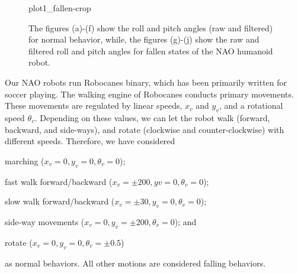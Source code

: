 \documentclass[letterpaper]{article}
\begin{document}
\begin{figure}[!ht]
{       {plot1_fallen-crop}}
  \caption{The figures (a)-(f) show the roll and pitch angles (raw and filtered) for normal 
behavior, while, the figures (g)-(j) show the raw and filtered roll and pitch angles for fallen 
states of the NAO humanoid robot.}
  \label{fig:normalFallenBehavior}

\end{figure}

Our NAO robots run {\sf Robocanes} binary, which has been primarily written for soccer
playing. The walking engine of {\sf Robocanes} conducts primary movements. These movements are
regulated by linear speeds, $x_v$ and $y_v$, and a rotational speed $\theta_v$. Depending on these
values, we can let the robot walk (forward, backward, and side-ways), and rotate (clockwise and
counter-clockwise) with different speeds. Therefore, we have considered \begin{inparaenum}[(1)]
\item marching ($x_v = 0 , y_v = 0, \theta_v = 0$); \item fast walk forward/backward ($x_v = \pm200
, y v = 0, \theta_v = 0$); \item \item slow walk forward/backward ($x_v = \pm30 , y_v = 0, \theta_v
= 0$); \item side-way movements ($x_v = 0, y_v = \pm200, \theta_v = 0$); and  \item rotate
($x_v = 0 , y_v = 0, \theta_v = \pm 0.5$) \end{inparaenum} as normal behaviors. All other motions
are considered falling behaviors. 
\end{document}
